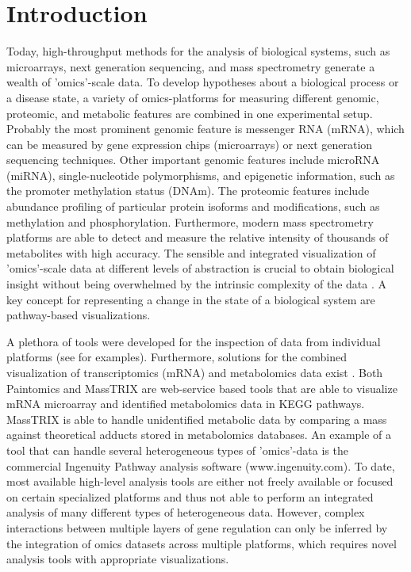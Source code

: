 \documentclass[final,5p,times,twocolumn]{elsarticle}
\begin{document}

\section{Introduction}
Today, high-throughput methods for the analysis of biological systems, such as microarrays, next generation sequencing, and mass spectrometry generate a wealth of 'omics'-scale data. To develop hypotheses about a biological process or a disease state, a variety of omics-platforms for measuring different genomic, proteomic, and metabolic features are combined in one experimental setup. Probably the most prominent genomic feature is messenger RNA (mRNA), which can be measured by gene expression chips (microarrays) or next generation sequencing techniques. Other important genomic features include microRNA (miRNA), single-nucleotide polymorphisms, and epigenetic information, such as the promoter methylation status (DNAm). The proteomic features include abundance profiling of particular protein isoforms and modifications, such as methylation and phosphorylation. Furthermore, modern mass spectrometry platforms are able to detect and measure the relative intensity of thousands of metabolites with high accuracy. The sensible and integrated visualization of 'omics'-scale data at different levels of abstraction is crucial to obtain biological insight without being overwhelmed by the intrinsic complexity of the data \cite{Gehlenborg2010}. A key concept for representing a change in the state of a biological system are pathway-based visualizations.

A plethora of tools were developed for the inspection of data from individual platforms (see \cite{Gehlenborg2010} for examples). Furthermore, solutions for the combined visualization of transcriptomics (mRNA) and metabolomics data exist \cite{Garcia-Alcalde2011,Waegele2012}. Both Paintomics \cite{Garcia-Alcalde2011} and MassTRIX \cite{Waegele2012} are web-service based tools that are able to visualize mRNA microarray and identified metabolomics data in KEGG \cite{Kanehisa2006} pathways. MassTRIX is able to handle unidentified metabolic data by comparing a mass against theoretical adducts stored in metabolomics databases. An example of a tool that can handle several heterogeneous types of 'omics'-data is the commercial Ingenuity Pathway analysis software (www.ingenuity.com). To date, most available high-level analysis tools are either not freely available or focused on certain specialized platforms and thus not able to perform an integrated analysis of many different types of heterogeneous data. However, complex interactions between multiple layers of gene regulation can only be inferred by the integration of omics datasets across multiple platforms, which requires novel analysis tools with appropriate visualizations.
\end{document}
